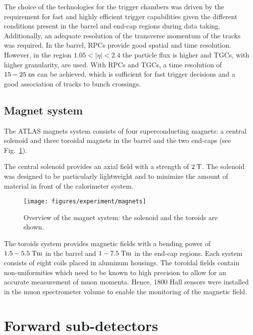 The choice of the technologies for the trigger chambers was driven 
by the requirement for fast and highly efficient trigger capabilities
given the different conditions present in the barrel and end-cap
regions during data taking. 
Additionally, an adequate resolution of the transverse momentum of the
tracks was required. 
In the barrel, RPCs provide good spatial and time resolution.
However, in the region \mbox{$1.05 < |\eta| < 2.4$}  the particle flux
is higher and TGCs, with higher granularity, are used.
With RPCs and TGCs, a time resolution of \mbox{$15 - 25 \; \mathrm{ns}$} can be
achieved, 
which is sufficient for fast trigger decisions and a good association of
tracks to bunch crossings.

\subsection{Magnet system}
\label{sec:magnets}

The ATLAS magnets system consists of four superconducting
magnets: a central solenoid and three toroidal magnets in the barrel and the
two end-caps (see Fig.~\ref{fig:magnets}).

The central solenoid provides an axial field with a strength of \mbox{$2 \; \mathrm{T}$}.
The solenoid was designed to be particularly lightweight and to
minimize the amount of material in front of the calorimeter system.

\begin{figure}[ht]
\begin{center}
\texttt{[image: figures/experiment/magnets]}
\caption[Overview of the magnet system]{
  Overview of the magnet system:
  the solenoid and the toroids are shown.}
\label{fig:magnets}
\end{center}
\end{figure}

The toroids system provides magnetic fields with a bending power
of \mbox{$1.5 - 5.5 \; \mathrm{Tm}$} in the barrel and \mbox{$1 - 7.5 \; \mathrm{Tm}$} in the end-cap regions.
Each system consists of eight coils placed in aluminum housings.
The toroidal fields contain non-uniformities which need to be known to
high precision to allow for an accurate measurement of muon momenta.
Hence, 1800 Hall sensors were installed in the muon spectrometer 
volume to enable the monitoring of the magnetic field.


\section{Forward sub-detectors}
\label{sec:forward}

